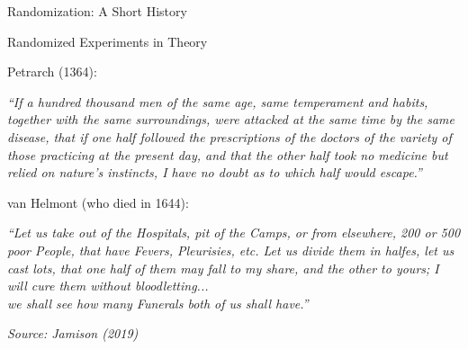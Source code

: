 \documentclass[10pt,xcolor=table,ignorenonframetext,handout,aspectratio=169]{beamer}
\begin{document}

\begin{frame}[plain]
\begin{center}
	
	\Large{\textcolor{williams}{Randomization:  A Short History}}
	
\end{center}
\end{frame}



\begin{frame}{Randomized Experiments in Theory}

\medskip
Petrarch (1364):

\begin{center}
	\begin{small}
		\emph{``If a hundred thousand men of the same age, same temperament and habits, 
			together with the same surroundings, were attacked at the same time 
			by the same disease, that if one half followed the prescriptions of the doctors 
			of the variety of those practicing at the present day, and that the other half took no medicine but relied on nature's instincts, I have no doubt as to which half would escape.''}
		
	\end{small}
\end{center}

\pause
\medskip
van Helmont (who died in 1644):

\begin{center}
	\begin{small}
		\emph{``Let us take out of the Hospitals, pit of the Camps, or from elsewhere, 
			200 or 500 poor People, that have Fevers, Pleurisies, etc. Let us divide them 
			in halfes, let us cast lots, that one half of them may fall to my share, 
			and the other to yours; I will cure them without bloodletting... \\
			we shall see 
			how many Funerals both of us shall have.''}
	\end{small}
\end{center}

\medskip
\scriptsize{\emph{Source:  Jamison (2019)}}

\end{frame}
\end{document}
